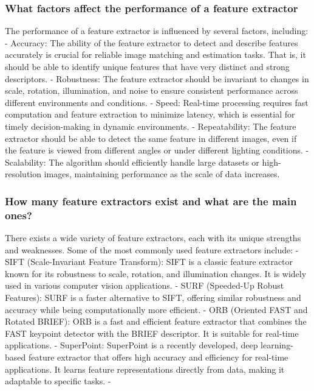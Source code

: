 \subsubsection*{What factors affect the performance of a feature extractor}
The performance of a feature extractor is influenced by several factors, including:
- Accuracy: The ability of the feature extractor to detect and describe features accurately is crucial for reliable image matching and estimation tasks. That is, it should be able to identify unique features that have very distinct and strong descriptors.
- Robustness: The feature extractor should be invariant to changes in scale, rotation, illumination, and noise to ensure consistent performance across different environments and conditions.
- Speed: Real-time processing requires fast computation and feature extraction to minimize latency, which is essential for timely decision-making in dynamic environments.
- Repeatability: The feature extractor should be able to detect the same feature in different images, even if the feature is viewed from different angles or under different lighting conditions.
- Scalability: The algorithm should efficiently handle large datasets or high-resolution images, maintaining performance as the scale of data increases.

\subsubsection*{How many feature extractors exist and what are the main ones?}

There exists a wide variety of feature extractors, each with its unique strengths and weaknesses. Some of the most commonly used feature extractors include: 
- SIFT (Scale-Invariant Feature Transform): SIFT is a classic feature extractor known for its robustness to scale, rotation, and illumination changes. It is widely used in various computer vision applications.
- SURF (Speeded-Up Robust Features): SURF is a faster alternative to SIFT, offering similar robustness and accuracy while being computationally more efficient.
- ORB (Oriented FAST and Rotated BRIEF): ORB is a fast and efficient feature extractor that combines the FAST keypoint detector with the BRIEF descriptor. It is suitable for real-time applications.
- SuperPoint: SuperPoint is a recently developed, deep learning-based feature extractor that offers high accuracy and efficiency for real-time applications. It learns feature representations directly from data, making it adaptable to specific tasks.
- 



